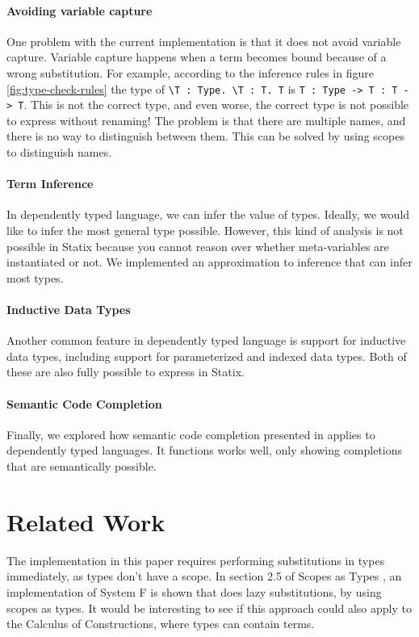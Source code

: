 \documentclass[a4paper,UKenglish,cleveref, autoref, thm-restate]{oasics-v2021}
\begin{document}
\paragraph*{Avoiding variable capture}
One problem with the current implementation is that it does not avoid variable capture. Variable capture happens when a term becomes bound because of a wrong substitution. For example, according to the inference rules in figure \ref{fig:type-check-rules} the type of \verb|\T : Type. \T : T. T| is \verb|T : Type -> T : T -> T|. This is not the correct type, and even worse, the correct type is not possible to express without renaming! The problem is that there are multiple names, and there is no way to distinguish between them. This can be solved by using scopes to distinguish names. 

\paragraph*{Term Inference}
In dependently typed language, we can infer the value of types. Ideally, we would like to infer the most general type possible. However, this kind of analysis is not possible in Statix because you cannot reason over whether meta-variables are instantiated or not. We implemented an approximation to inference that can infer most types.

\paragraph*{Inductive Data Types}
Another common feature in dependently typed language is support for inductive data types, including support for parameterized and indexed data types. Both of these are also fully possible to express in Statix. 

\paragraph*{Semantic Code Completion}
Finally, we explored how semantic code completion presented in \cite{codecompletion} applies to dependently typed languages. It functions works well, only showing completions that are semantically possible.


\section{Related Work}
The implementation in this paper requires performing substitutions in types immediately, as types don't have a scope. In section 2.5 of Scopes as Types \cite{scopes_as_types}, an implementation of System F is shown that does lazy substitutions, by using scopes as types. It would be interesting to see if this approach could also apply to the Calculus of Constructions, where types can contain terms. 
\end{document}
